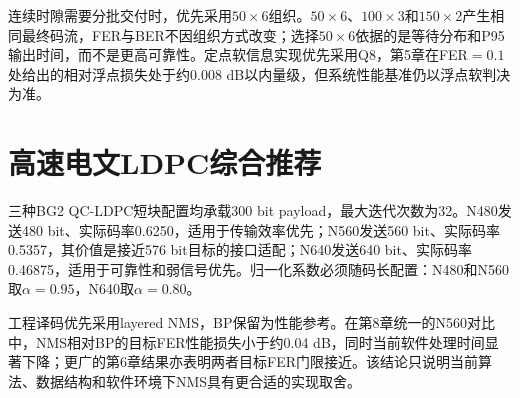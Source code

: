 连续时隙需要分批交付时，优先采用$50\times6$组织。$50\times6$、$100\times3$和$150\times2$产生相同最终码流，FER与BER不因组织方式改变；选择$50\times6$依据的是等待分布和P95输出时间，而不是更高可靠性。定点软信息实现优先采用Q8，第5章在FER$=0.1$处给出的相对浮点损失处于约0.008 dB以内量级，但系统性能基准仍以浮点软判决为准。

\begin{table}[htbp]
  \centering\scriptsize
  \caption{卷积码系统级最终配置矩阵}
  \label{tab:final-cc-matrix}
\end{table}

\section{高速电文LDPC综合推荐}

三种BG2 QC-LDPC短块配置均承载300 bit payload，最大迭代次数为32。N480发送480 bit、实际码率0.6250，适用于传输效率优先；N560发送560 bit、实际码率0.5357，其价值是接近576 bit目标的接口适配；N640发送640 bit、实际码率0.46875，适用于可靠性和弱信号优先。归一化系数必须随码长配置：N480和N560取$\alpha=0.95$，N640取$\alpha=0.80$。

工程译码优先采用layered NMS，BP保留为性能参考。在第8章统一的N560对比中，NMS相对BP的目标FER性能损失小于约0.04 dB，同时当前软件处理时间显著下降；更广的第6章结果亦表明两者目标FER门限接近。该结论只说明当前算法、数据结构和软件环境下NMS具有更合适的实现取舍。


